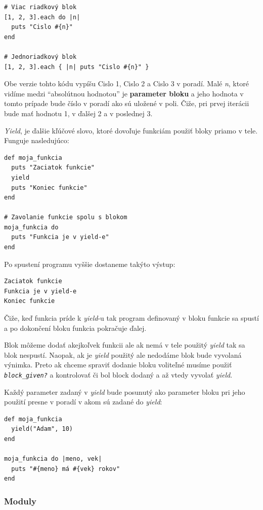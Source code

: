 \begin{verbatim}
# Viac riadkový blok
[1, 2, 3].each do |n|
  puts "Cislo #{n}"
end

# Jednoriadkový blok
[1, 2, 3].each { |n| puts "Cislo #{n}" }
\end{verbatim}

Obe verzie tohto kódu vypíšu Cislo 1, Cislo 2 a Cislo 3 v poradí. Malé \emph{n}, ktoré vidíme medzi ``absolútnou hodnotou'' je \textbf{parameter bloku} a jeho hodnota v tomto prípade bude číslo v poradí ako sú uložené v poli. Čiže, pri prvej iterácii bude mať hodnotu 1, v ďalšej 2 a v poslednej 3.

\emph{Yield}, je ďalšie kľúčové slovo, ktoré dovoľuje funkciám použiť bloky priamo v tele. Funguje nasledujúco:

\begin{verbatim}
def moja_funkcia
  puts "Zaciatok funkcie"
  yield
  puts "Koniec funkcie"
end

# Zavolanie funkcie spolu s blokom
moja_funkcia do
  puts "Funkcia je v yield-e"
end
\end{verbatim}

Po spustení programu vyššie dostaneme takýto výstup:
\begin{verbatim}
Zaciatok funkcie
Funkcia je v yield-e
Koniec funkcie
\end{verbatim}

Čiže, keď funkcia príde k \emph{yield}-u tak program definovaný v bloku funkcie sa spustí a po dokončení bloku funkcia pokračuje ďalej. 

Blok môžeme dodať akejkoľvek funkcii ale ak nemá v tele použitý \emph{yield} tak sa blok nespustí. Naopak, ak je \emph{yield} použitý ale nedodáme blok bude vyvolaná výnimka. Preto ak chceme spraviť dodanie bloku voliteľné musíme použiť \emph{\texttt{block\_given?}} a kontrolovať či bol block dodaný a až vtedy vyvolať \emph{yield}.

\clearpage
Každý parameter zadaný v \emph{yield} bude posunutý ako parameter bloku pri jeho použití presne v poradí v akom sú zadané do \emph{yield}:

\begin{verbatim}
def moja_funkcia
  yield("Adam", 10)
end

moja_funkcia do |meno, vek| 
  puts "#{meno} má #{vek} rokov"
end
\end{verbatim}

\subsubsection{Moduly}

